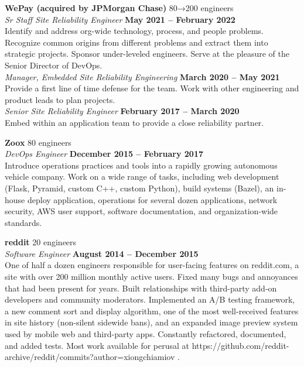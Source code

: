 \documentclass[margin,line]{resume}
\begin{document}
\begin{resume}
    \textbf{\listing WePay (acquired by JPMorgan Chase)} \hfill {\selectfont\texttildelow}80→200 engineers
    \vspace{2mm}\\\vspace{1mm}%
    \textsl{Sr Staff Site Reliability Engineer} \hfill \textbf{May 2021 -- February 2022}\\
    Identify and address org-wide technology, process, and people problems. Recognize common origins from different problems and extract them into strategic projects. Sponsor under-leveled engineers. Serve at the pleasure of the Senior Director of DevOps.\\
    \textsl{Manager, Embedded Site Reliability Engineering} \hfill \textbf{March 2020 -- May 2021}\\
    Provide a first line of time defense for the team.  Work with other engineering and product leads to plan projects.\\
    \textsl{Senior Site Reliability Engineer} \hfill \textbf{February 2017 -- March 2020}\\
    Embed within an application team to provide a close reliability partner.

    \textbf{\listing Zoox} \hfill {\selectfont\texttildelow}80 engineers
    \vspace{2mm}\\\vspace{1mm}%
    \textsl{DevOps Engineer} \hfill \textbf{December 2015 -- February 2017}\\
    Introduce operations practices and tools into a rapidly growing autonomous vehicle company.
    Work on a wide range of tasks, including web development (Flask, Pyramid, custom C++, custom Python), build systems (Bazel), an in-house deploy application, operations for several dozen applications, network security, AWS user support, software documentation, and organization-wide standards.

    \textbf{\listing reddit} \hfill {\selectfont\texttildelow}20 engineers
    \vspace{2mm}\\\vspace{1mm}%
    \textsl{Software Engineer} \hfill \textbf{August 2014 -- December 2015}\\
    One of half a dozen engineers responsible for user-facing features on reddit.com, a site with over 200 million monthly active users.
    Fixed many bugs and annoyances that had been present for years.
    Built relationships with third-party add-on developers and community moderators.
    Implemented an A/B testing framework, a new comment sort and display algorithm, one of the most well-received features in site history (non-silent sidewide bans), and an expanded image preview system used by mobile web and third-party apps.
    Constantly refactored, documented, and added tests.
    Most work available for perusal at https://github.com/reddit-archive/reddit/commits?author=xiongchiamiov .


\end{resume}
\end{document}
